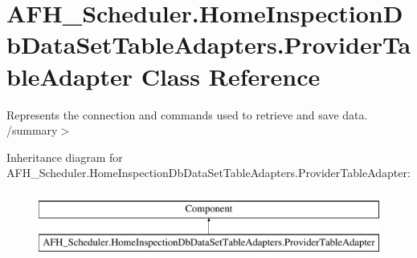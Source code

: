 \section{A\+F\+H\+\_\+\+Scheduler.\+Home\+Inspection\+Db\+Data\+Set\+Table\+Adapters.\+Provider\+Table\+Adapter Class Reference}
\label{class_a_f_h___scheduler_1_1_home_inspection_db_data_set_table_adapters_1_1_provider_table_adapter}


Represents the connection and commands used to retrieve and save data. /summary$>$  


Inheritance diagram for A\+F\+H\+\_\+\+Scheduler.\+Home\+Inspection\+Db\+Data\+Set\+Table\+Adapters.\+Provider\+Table\+Adapter\+:\begin{figure}[H]
\begin{center}
\leavevmode
\includegraphics[height=2.000000cm]{class_a_f_h___scheduler_1_1_home_inspection_db_data_set_table_adapters_1_1_provider_table_adapter}
\end{center}
\end{figure}
